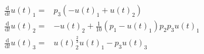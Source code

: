 \begin{align}
\frac{\mathrm{d}}{\mathrm{d}t} u(t)_1 =& p_3 \left(  - u(t)_1 + u(t)_2 \right) \\
\frac{\mathrm{d}}{\mathrm{d}t} u(t)_2 =&  - u(t)_2 + \frac{1}{10} \left( p_1 - u(t)_1 \right) p_2 p_3 u(t)_1 \\
\frac{\mathrm{d}}{\mathrm{d}t} u(t)_3 =& u(t)_2^{\frac{2}{3}} u(t)_1 - p_3 u(t)_3
\end{align}
